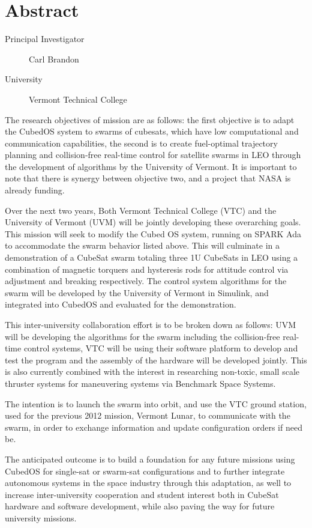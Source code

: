 \section{Abstract}

\begin{description}
\item[Principal Investigator] Carl Brandon
\item[University] Vermont Technical College
\end{description}

The research objectives of mission are as follows: the first objective
is to adapt the CubedOS system to swarms of cubesats, which have low
computational and communication capabilities, the second is to create
fuel-optimal trajectory planning and collision-free real-time control
for satellite swarms in LEO through the development of algorithms by
the University of Vermont. It is important to note that there is
synergy between objective two, and a project that NASA is already
funding\cite{ossareh:2019}.

Over the next two years, Both Vermont Technical College (VTC) and the
University of Vermont (UVM) will be jointly developing these
overarching goals. This mission will seek to modify the Cubed OS
system, running on SPARK Ada to accommodate the swarm behavior listed
above. This will culminate in a demonstration of a CubeSat swarm
totaling three 1U CubeSats in LEO using a combination of magnetic
torquers and hysteresis rods for attitude control via adjustment and
breaking respectively. The control system algorithms for the swarm
will be developed by the University of Vermont in Simulink, and
integrated into CubedOS and evaluated for the demonstration.

This inter-university collaboration effort is to be broken down as
follows: UVM will be developing the algorithms for the swarm including
the collision-free real-time control systems, VTC will be using their
software platform to develop and test the program and the assembly of
the hardware will be developed jointly. This is also currently
combined with the interest in researching non-toxic, small scale
thruster systems for maneuvering systems via Benchmark Space Systems.

The intention is to launch the swarm into orbit, and use the VTC
ground station, used for the previous 2012 mission, Vermont Lunar, to
communicate with the swarm, in order to exchange information and
update configuration orders if need be.
	
The anticipated outcome is to build a foundation for any future
missions using CubedOS for single-sat or swarm-sat configurations and
to further integrate autonomous systems in the space industry through
this adaptation, as well to increase inter-university cooperation and
student interest both in CubeSat hardware and software development,
while also paving the way for future university missions.
	
